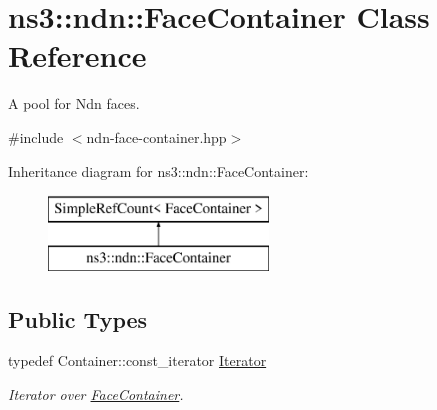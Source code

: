 \hypertarget{classns3_1_1ndn_1_1FaceContainer}{}\section{ns3\+:\+:ndn\+:\+:Face\+Container Class Reference}
\label{classns3_1_1ndn_1_1FaceContainer}


A pool for Ndn faces.  




{\ttfamily \#include $<$ndn-\/face-\/container.\+hpp$>$}

Inheritance diagram for ns3\+:\+:ndn\+:\+:Face\+Container\+:\begin{figure}[H]
\begin{center}
\leavevmode
\includegraphics[height=2.000000cm]{classns3_1_1ndn_1_1FaceContainer}
\end{center}
\end{figure}
\subsection*{Public Types}
\begin{DoxyCompactItemize}
\item 
typedef Container\+::const\+\_\+iterator \hyperlink{classns3_1_1ndn_1_1FaceContainer_a73807fcd505b7b06616d1965ed9dea54}{Iterator}\hypertarget{classns3_1_1ndn_1_1FaceContainer_a73807fcd505b7b06616d1965ed9dea54}{}\label{classns3_1_1ndn_1_1FaceContainer_a73807fcd505b7b06616d1965ed9dea54}

\begin{DoxyCompactList}\small\item\em Iterator over \hyperlink{classns3_1_1ndn_1_1FaceContainer}{Face\+Container}. \end{DoxyCompactList}\end{DoxyCompactItemize}
